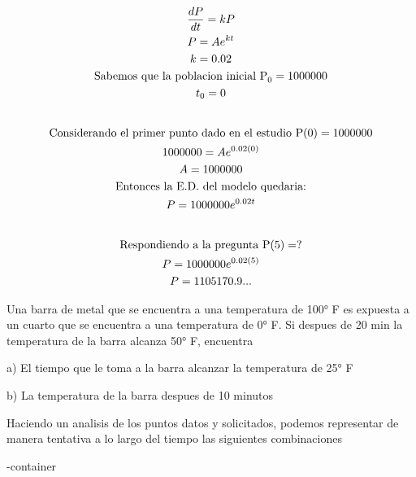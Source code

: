 \documentclass{article}
\begin{document}
\begin{gather*}
\frac{dP}{dt} = kP \\
P = Ae^{kt} \\
k = 0.02 \\
\text{Sabemos que la poblacion inicial P}_{0}=1000000 \\
t_{0} =0 \\
\vspace{0.5em} \\
\text{Considerando el primer punto dado en el estudio  P}(0)=1000000 \\
1000000 = Ae^{0.02(0)} \\
A = 1000000 \\
\text{Entonces la E.D. del modelo quedaria:} \\
P = 1000000e^{0.02t} \\
\vspace{0.5em} \\
\text{Respondiendo a la pregunta P}(5) = ? \\
P = 1000000e^{0.02(5)} \\
P = 1105170.9...
\end{gather*}


Una barra de metal que se encuentra a una temperatura de 100° F es expuesta a  un cuarto que se encuentra a una temperatura de 0° F. Si despues de 20 min la temperatura de la barra alcanza 50° F, encuentra

a) El tiempo que le toma a la barra alcanzar la temperatura de 25° F

b) La temperatura de la barra despues de 10 minutos 



Haciendo un analisis de los puntos datos y solicitados, podemos representar de manera tentativa a lo largo del tiempo las siguientes combinaciones



\image-container
\end{document}
